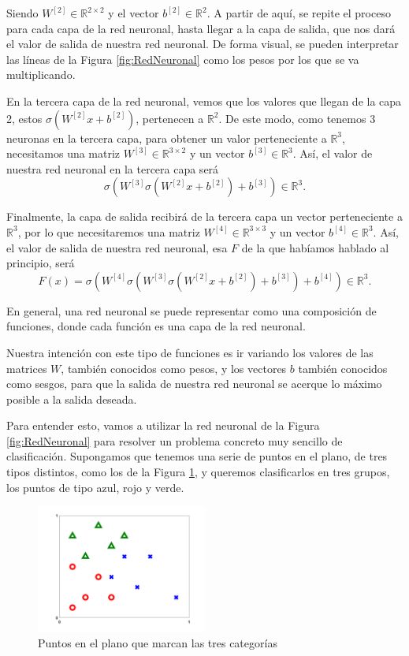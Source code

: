 \documentclass[a4paper,11pt,spanish, twoside, leqno]{tfg-uam}
\theoremstyle{definition}
\begin{document}
Siendo $W^{[2]}\in\mathbb{R}^{2\times2}$ y el vector $b^{[2]}\in\mathbb{R}^2$. A partir de aquí, se repite el proceso para cada capa de la red neuronal, hasta llegar a la capa de salida, que nos dará el valor de salida de nuestra red neuronal. De forma visual, se pueden interpretar las líneas de la Figura \ref{fig:RedNeuronal} como los pesos por los que se va multiplicando.

En la tercera capa de la red neuronal, vemos que los valores que llegan de la capa 2, estos $\sigma(W^{[2]}x+b^{[2]})$, pertenecen a $\mathbb{R}^2$. De este modo, como tenemos 3 neuronas en la tercera capa, para obtener un valor perteneciente a $\mathbb{R}^3$, necesitamos una matriz $W^{[3]}\in\mathbb{R}^{3\times2}$ y un vector $b^{[3]}\in\mathbb{R}^3$. Así, el valor de nuestra red neuronal en la tercera capa será
\begin{equation*}
    \sigma(W^{[3]}\sigma(W^{[2]}x+b^{[2]})+b^{[3]})\in\mathbb{R}^3.
\end{equation*}

Finalmente, la capa de salida recibirá de la tercera capa un vector perteneciente a $\mathbb{R}^3$, por lo que necesitaremos una matriz $W^{[4]}\in\mathbb{R}^{3\times3}$ y un vector $b^{[4]}\in\mathbb{R}^3$. Así, el valor de salida de nuestra red neuronal, esa $F$ de la que habíamos hablado al principio, será
\begin{equation}
    F(x)=\sigma(W^{[4]}\sigma(W^{[3]}\sigma(W^{[2]}x+b^{[2]})+b^{[3]})+b^{[4]})\in\mathbb{R}^3.
\end{equation}\label{eq:RedNeuronal}

En general, una red neuronal se puede representar como una composición de funciones, donde cada función es una capa de la red neuronal. 

Nuestra intención con este tipo de funciones es ir variando los valores de las matrices $W$, también conocidos como pesos, y los vectores $b$ también conocidos como sesgos, para que la salida de nuestra red neuronal se acerque lo máximo posible a la salida deseada. 

Para entender esto, vamos a utilizar la red neuronal de la Figura \ref{fig:RedNeuronal} para resolver un problema concreto muy sencillo de clasificación. Supongamos que tenemos una serie de puntos en el plano, de tres tipos distintos, como los de la Figura \ref{fig:Clasificacion}, y queremos clasificarlos en tres grupos, los puntos de tipo azul, rojo y verde.


\begin{figure}
    \centering
    \includegraphics[width=0.5\textwidth]{Figuras/pic_xy.png}
    \caption{Puntos en el plano que marcan las tres categorías}
    \label{fig:Clasificacion}
\end{figure}
\end{document}
